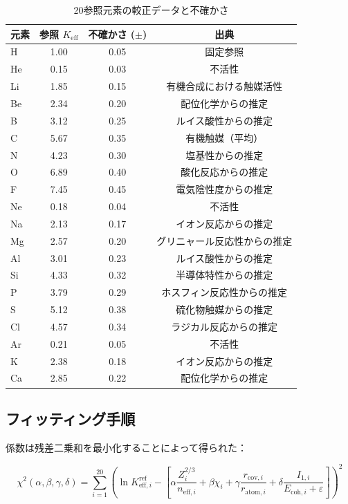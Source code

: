 \documentclass[11pt,a4paper]{article}
\newcommand{\Keff}{K_{\mathrm{eff}}}
\begin{document}
	\begin{table}[htbp]
		\centering
		\caption{20参照元素の較正データと不確かさ}
		\label{tab:calibration}
		\begin{tabular}{lccc}
			\toprule
			元素 & 参照 $\Keff$ & 不確かさ ($\pm$) & 出典 \\
			\midrule
			H & 1.00 & 0.05 & 固定参照 \\
			He & 0.15 & 0.03 & 不活性 \\
			Li & 1.85 & 0.15 & 有機合成における触媒活性 \\
			Be & 2.34 & 0.20 & 配位化学からの推定 \\
			B & 3.12 & 0.25 & ルイス酸性からの推定 \\
			C & 5.67 & 0.35 & 有機触媒（平均） \\
			N & 4.23 & 0.30 & 塩基性からの推定 \\
			O & 6.89 & 0.40 & 酸化反応からの推定 \\
			F & 7.45 & 0.45 & 電気陰性度からの推定 \\
			Ne & 0.18 & 0.04 & 不活性 \\
			Na & 2.13 & 0.17 & イオン反応からの推定 \\
			Mg & 2.57 & 0.20 & グリニャール反応性からの推定 \\
			Al & 3.01 & 0.23 & ルイス酸性からの推定 \\
			Si & 4.33 & 0.32 & 半導体特性からの推定 \\
			P & 3.79 & 0.29 & ホスフィン反応性からの推定 \\
			S & 5.12 & 0.38 & 硫化物触媒からの推定 \\
			Cl & 4.57 & 0.34 & ラジカル反応からの推定 \\
			Ar & 0.21 & 0.05 & 不活性 \\
			K & 2.38 & 0.18 & イオン反応からの推定 \\
			Ca & 2.85 & 0.22 & 配位化学からの推定 \\
			\bottomrule
		\end{tabular}
	\end{table}
	
	\subsection{フィッティング手順}
	
	係数は残差二乗和を最小化することによって得られた：
	
	\begin{equation}
		\chi^2(\alpha,\beta,\gamma,\delta) = \sum_{i=1}^{20} \left( \ln K_{\mathrm{eff},i}^{\text{ref}} - \left[ \alpha \frac{Z_i^{2/3}}{n_{\text{eff},i}} + \beta \chi_i + \gamma \frac{r_{\text{cov},i}}{r_{\text{atom},i}} + \delta \frac{I_{1,i}}{E_{\text{coh},i} + \varepsilon} \right] \right)^2
		\label{eq:chi2}
	\end{equation}
	
\end{document}
